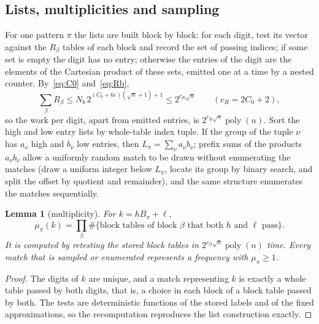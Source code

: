 \documentclass[11pt]{article}
\newtheorem{lemma}{Lemma}[section]
\theoremstyle{definition}
\newcommand{\eps}{\varepsilon}
\newcommand{\poly}{\operatorname{poly}}
\begin{document}
\subsection{Lists, multiplicities and sampling}\label{sec:lists}
For one pattern $\pi$ the lists are built block by block: for each digit, test its vector against the $R_\beta$
tables of each block and record the set of passing indices; if some set is empty the digit has no entry; otherwise
the entries of the digit are the elements of the Cartesian product of these sets, emitted one at a time by a nested
counter. By~\eqref{eq:C0} and~\eqref{eq:Rb},
\begin{equation}\label{eq:sumR}
 \sum_\beta R_\beta\le N_b\,2^{(C_0+6\eps)(\sqrt n+1)+1}\le2^{c_R\sqrt n}\qquad(c_R=2C_0+2),
\end{equation}
so the work per digit, apart from emitted entries, is $2^{c_R\sqrt n}\poly(n)$. Sort the high and low entry lists by
whole-table index tuple. If the group of the tuple $\nu$ has $a_\nu$ high and $b_\nu$ low entries, then
$L_\pi=\sum_\nu a_\nu b_\nu$; prefix sums of the products $a_\nu b_\nu$ allow a uniformly random match to be drawn
without enumerating the matches (draw a uniform integer below $L_\pi$, locate its group by binary search, and split
the offset by quotient and remainder), and the same structure enumerates the matches sequentially.

\begin{lemma}[multiplicity]\label{lem:mult}
For $k=hB_\pi+\ell$,
\[
 \mu_\pi(k)=\prod_{\beta}\#\{\text{block tables of block }\beta\text{ that both }h\text{ and }\ell\text{ pass}\}.
\]
It is computed by retesting the stored block tables in $2^{c_R\sqrt n}\poly(n)$ time. Every match that is sampled or
enumerated represents a frequency with $\mu_\pi\ge1$.
\end{lemma}
\begin{proof}
The digits of $k$ are unique, and a match representing $k$ is exactly a whole table passed by both digits, that is,
a choice in each block of a block table passed by both. The tests are deterministic functions of the stored labels
and of the fixed approximations, so the recomputation reproduces the list construction exactly.
\end{proof}
\end{document}
